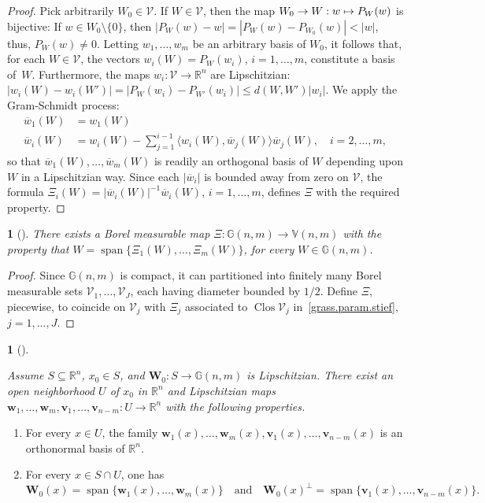 \documentclass[11pt]{article}
\newcounter{cdrthm}[section]
\theoremstyle{definition}
\theoremstyle{jepanonymous}
\newtheorem{jepempty}[cdrthm]{}
\newenvironment{enonce}[2][remark]{\begin{jepempty}[#2]}{\end{jepempty}}
\theoremstyle{plain}
\newcommand\mto{\mathchoice{\longmapsto}{\mapsto}{\mapsto}{\mapsto}}
\newcommand{\quand}{\quad\text{and}\quad}
\newenvironment{Empty}[2][\null]{%
\begin{enonce}[remark]{#1}#2}
{\end{enonce}}
\newcommand{\R}{\mathbb{R}}
\newcommand{\Rn}{\R^n}
\newcommand{\calV}{\mathscr{V}}
\newcommand{\bW}{{\boldsymbol{W}}}
\newcommand{\bv}{{\boldsymbol{v}}}
\newcommand{\bw}{{\boldsymbol{w}}}
\newcommand{\bV}{\mathbb{V}}
\newcommand{\bG}{\mathbb{G}}
\DeclareMathOperator{\rmClos}{\mathrm{Clos}}
\DeclareMathOperator{\rmspan}{\mathrm{span}}
\let\la\langle
\let\ra\rangle
\let\subset\subseteq
\begin{document}
\begin{proof}
Pick arbitrarily $W_0 \in \calV$.
If $W \in \calV$, then the map $W_0 \to W: w \mto P_W(w)$ is bijective: If $w \in W_0 \setminus \{0\}$, then $\left|P_W(w)-w\right| = \left|P_W(w)-P_{W_0}(w)\right| < |w|$, thus, $P_W(w) \neq 0$.
Letting $w_1,\ldots,w_m$ be an arbitrary basis of $W_0$, it follows that, for each $W \in \calV$, the vectors $w_i(W) = P_W(w_i)$, $i=1,\ldots,m$, constitute a basis of~$W$.
Furthermore, the maps $w_i: \calV \to \Rn$ are Lipschitzian: $\left| w_i(W)-w_i(W')\right| = \left|P_W(w_i) - P_{W'}(w_i)\right| \leq d(W,W') |w_i|$.
We apply the Gram-Schmidt process:
\begin{align*}
\overline{w}_1(W) &= w_1(W)\\[-5pt]
\tag*{and} \overline{w}_i(W) &= w_i(W) - \sum_{j=1}^{i-1} \la w_i(W), \overline{w}_j(W) \ra \overline{w}_j(W),\quad i=2,\ldots,m,
\end{align*}
so that $\overline{w}_1(W),\ldots,\overline{w}_m(W)$ is readily an orthogonal basis of $W$ depending upon $W$ in a Lipschitzian way.
Since each $\left|\overline{w}_i\right|$ is bounded away from zero on $\calV$, the formula $\Xi_i(W) = \left|\overline{w}_i(W)\right|^{-1}\overline{w}_i(W)$, $i=1,\ldots,m$, defines $\Xi$ with the required property.
\end{proof}

\begin{Empty}[]
\label{grass.param.stief.borel}
{\it
There exists a Borel measurable map $\Xi: \bG(n,m) \to \bV(n,m)$ with the property that $W = \rmspan \{ \Xi_1(W),\ldots,\Xi_m(W)\}$, for every $W \in \bG(n,m)$.
}
\end{Empty}

\begin{proof}
Since $\bG(n,m)$ is compact, it can partitioned into finitely many Borel measurable sets $\calV_1,\ldots,\calV_J$, each having diameter bounded by $1/2$.
Define $\Xi$, piecewise, to coincide on $\calV_j$ with $\Xi_j$ associated to $\rmClos \calV_j$ in~\ref{grass.param.stief}, $j=1,\ldots,J$.
\end{proof}

\begin{Empty}[]
\label{orth.frame}
{\it
Assume $S \subset \Rn$, $x_0 \in S$, and $\bW_0: S \to \bG(n,m)$ is Lipschitzian. There exist an open neighborhood $U$ of $x_0$ in $\Rn$ and Lipschitzian maps $\bw_1,\ldots,\bw_m,\bv_1,\ldots,\bv_{n-m}\!: U \to \Rn$ with the following properties.
\begin{enumerate}
\item For every $x \in U$, the family $\bw_1(x),\ldots,\bw_m(x),\bv_1(x),\ldots,\bv_{n-m}(x)$ is an ortho\-normal basis of $\Rn$.
\item For every $x \in S \cap U$, one has
\begin{equation*}
\bW_0(x) = \rmspan \{ \bw_1(x),\ldots,\bw_m(x) \}
\quand
\bW_0(x)^\perp = \rmspan \{ \bv_1(x),\ldots,\bv_{n-m}(x) \}.
\end{equation*}
\end{enumerate}
}
\end{Empty}
\end{document}
